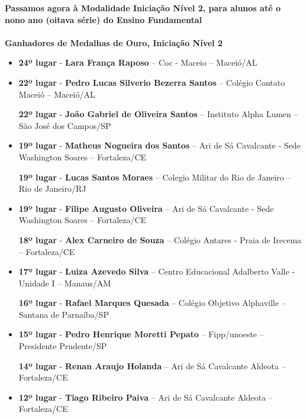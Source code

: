 \documentclass{article}
\begin{document}
\color{blue}
\textbf{Passamos agora à Modalidade Iniciação Nível 2, para alunos até o nono ano (oitava série) do Ensino Fundamental}\\\\
\textbf{\color{blue}Ganhadores de Medalhas de Ouro, \color{black}Iniciação Nível 2}
\color{black}

\begin{itemize}
\item
\textbf{24º lugar} - \textbf{Lara França Raposo} – Coc - Maceio – Maceió/AL


\item
\textbf{22º lugar} - \textbf{Pedro Lucas Silverio Bezerra Santos} – Colégio Contato Maceió – Maceió/AL


\textbf{22º lugar} - \textbf{João Gabriel de Oliveira Santos} – Instituto Alpha Lumen – São José dos Campos/SP



\item
\textbf{19º lugar} - \textbf{Matheus Nogueira dos Santos} – Ari de Sá Cavalcante - Sede Washington Soares – Fortaleza/CE


\textbf{19º lugar} - \textbf{Lucas Santos Moraes} – Colegio Militar do Rio de Janeiro – Rio de Janeiro/RJ



\item
\textbf{19º lugar} - \textbf{Filipe Augusto Oliveira} – Ari de Sá Cavalcante - Sede Washington Soares – Fortaleza/CE


\textbf{18º lugar} - \textbf{Alex Carneiro de Souza} – Colégio Antares - Praia de Irecema – Fortaleza/CE



\item
\textbf{17º lugar} - \textbf{Luiza Azevedo Silva} – Centro Educacional Adalberto Valle - Unidade I – Manaus/AM


\textbf{16º lugar} - \textbf{Rafael Marques Quesada} – Colégio Objetivo Alphaville – Santana de Parnaíba/SP



\item
\textbf{15º lugar} - \textbf{Pedro Henrique Moretti Pepato} – Fipp/unoeste – Presidente Prudente/SP


\textbf{14º lugar} - \textbf{Renan Araujo Holanda} – Ari de Sá Cavalcante Aldeota – Fortaleza/CE



\item
\textbf{12º lugar} - \textbf{Tiago Ribeiro Paiva} – Ari de Sá Cavalcante Aldeota – Fortaleza/CE



\end{itemize}
\end{document}
